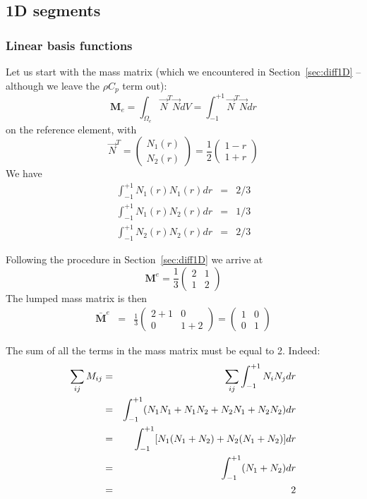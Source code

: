 
\subsection{1D segments}

\subsubsection{Linear basis functions}

Let us start with the mass matrix (which we encountered in 
Section~\ref{sec:diff1D} -- although we leave the $\rho C_p$ term out):
\begin{equation}
{\bm M}_e=\int_{\Omega_e} \vec{N}^T \vec{N} dV
= \int_{-1}^{+1} \vec{N}^T \vec{N} dr
\end{equation}
on the reference element, with 
\[
{\vec N}^T = 
\left(
\begin{array}{c}
N_1(r) \\ N_2(r)
\end{array}
\right)
=
\frac{1}{2}
\left(
\begin{array}{c}
1-r \\ 1+r
\end{array}
\right)
\]
We have 
\begin{eqnarray}
\int_{-1}^{+1} N_1(r) N_1(r) dr &=& 2/3 \\ 
\int_{-1}^{+1} N_1(r) N_2(r) dr &=& 1/3 \\
\int_{-1}^{+1} N_2(r) N_2(r) dr &=& 2/3
\end{eqnarray}

Following the procedure in Section~\ref{sec:diff1D} we arrive at
\[
{\bm M}^e= \frac{1}{3} 
\left(
\begin{array}{cc}
2  & 1 \\
1 & 2
\end{array}
\right)
\]
The lumped mass matrix is then
\begin{eqnarray}
\bar{\bm M}^e 
&=&
\frac{1}{3}
\left(
\begin{array}{cc}
2+1  & 0 \\
0 & 1+2
\end{array}
\right)
=
\left(
\begin{array}{cc}
1  & 0 \\
0 & 1
\end{array}
\right)
\end{eqnarray}

\begin{remark} 
The sum of all the terms in the mass matrix must be equal to 2. Indeed:
\begin{eqnarray}
\sum_{ij} M_{ij} 
&=&\sum_{ij} \int_{-1}^{+1} N_i N_j dr \nonumber\\
&=&\int_{-1}^{+1} (N_1N_1+N_1N_2+N_2N_1+N_2N_2) dr\nonumber\\
&=&\int_{-1}^{+1} [N_1(N_1+N_2)+N_2(N_1+N_2)]dr\nonumber\\
&=&\int_{-1}^{+1} (N_1 + N_2) dr\nonumber\\
&=& 2\nonumber
\end{eqnarray}
\end{remark}


